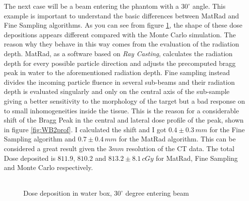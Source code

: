 \documentclass[12pt, a4paper, twoside]{book}
\begin{document}

The next case will be a beam entering the phantom with a $30^\circ$ angle. This example is important to understand the basic differences between MatRad and Fine Sampling algorithms. As you can see from figure \ref{fig:WB2}, the shape of these dose depositions appears different compared with the Monte Carlo simulation. The reason why they behave in this way comes from the evaluation of the radiation depth. MatRad, as a software based on \emph{Ray Casting}, calculates the radiation depth for every possible particle direction and adjusts the precomputed bragg peak in water to the aforementioned radiation depth. Fine sampling instead divides the incoming particle fluence in several sub-beams and their radiation depth is evaluated singularly and only on the central axis of the sub-sample giving a better sensitivity to the morphology of the target but a bad response on to small inhomogeneities inside the tissue.
This is the reason for a considerable shift of the Bragg Peak in the central and lateral dose profile of the peak, shown in figure \ref{fig:WB2prof}. I calculated the shift and I got $0.4\pm0.3\,mm$ for the Fine Sampling algorithm and $0.7\pm0.4\,mm$ for the MatRad algorithm. This can be considered a great result given the $3mm$ resolution of the CT data.
The total Dose deposited is $811.9$, $810.2$ and $813.2\pm8.1\,cGy$ for MatRad, Fine Sampling and Monte Carlo respectively.\\
\\

\begin{figure}[!t]
\centering
{}\quad
{}\quad
{}\quad
\caption{Dose deposition in water box, $30^\circ$ degree entering beam}
\label{fig:WB2}
\end{figure}
\end{document}
